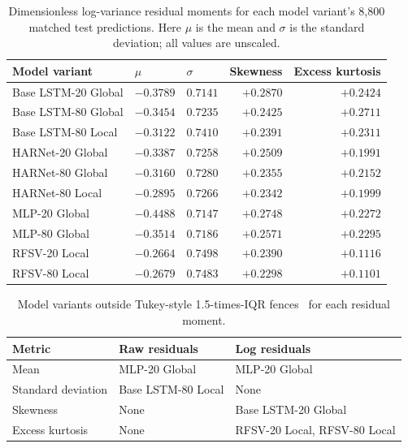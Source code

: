 \documentclass[12pt,a4paper]{article}
\numberwithin{equation}{section}
\numberwithin{table}{section}
\numberwithin{figure}{section}
\begin{document}
\begin{table}[htbp]
\begin{tabular*}{\textwidth}{@{\extracolsep{\fill}}lrrrr@{}}
\hline
Model variant & \multicolumn{1}{l}{$\mu$} & \multicolumn{1}{l}{$\sigma$} & Skewness & Excess kurtosis \\
\hline
Base LSTM-20 Global & $-0.3789$ & $0.7141$ & $+0.2870$ & $+0.2424$ \\
Base LSTM-80 Global & $-0.3454$ & $0.7235$ & $+0.2425$ & $+0.2711$ \\
Base LSTM-80 Local & $-0.3122$ & $0.7410$ & $+0.2391$ & $+0.2311$ \\
HARNet-20 Global & $-0.3387$ & $0.7258$ & $+0.2509$ & $+0.1991$ \\
HARNet-80 Global & $-0.3160$ & $0.7280$ & $+0.2355$ & $+0.2152$ \\
HARNet-80 Local & $-0.2895$ & $0.7266$ & $+0.2342$ & $+0.1999$ \\
MLP-20 Global & $-0.4488$ & $0.7147$ & $+0.2748$ & $+0.2272$ \\
MLP-80 Global & $-0.3514$ & $0.7186$ & $+0.2571$ & $+0.2295$ \\
RFSV-20 Local & $-0.2664$ & $0.7498$ & $+0.2390$ & $+0.1116$ \\
RFSV-80 Local & $-0.2679$ & $0.7483$ & $+0.2298$ & $+0.1101$ \\
\hline
\end{tabular*}
\caption{Dimensionless log-variance residual moments for each model variant's 8,800 matched test predictions. Here $\mu$ is the mean and $\sigma$ is the standard deviation; all values are unscaled.}
\label{tab:residual-moments-log}
\end{table}
\FloatBarrier
\begin{table}[htbp]
\centering\small\setlength{\tabcolsep}{5pt}
\begin{tabular}{lll}
\hline
Metric & Raw residuals & Log residuals \\
\hline
Mean & MLP-20 Global & MLP-20 Global \\
Standard deviation & Base LSTM-80 Local & None \\
Skewness & None & Base LSTM-20 Global \\
Excess kurtosis & None & RFSV-20 Local, RFSV-80 Local \\
\hline
\end{tabular}
\caption{Model variants outside Tukey-style 1.5-times-IQR fences~\cite{tukey1977} for each residual moment.}
\label{tab:residual-moment-outliers}
\end{table}
\FloatBarrier
\end{document}
